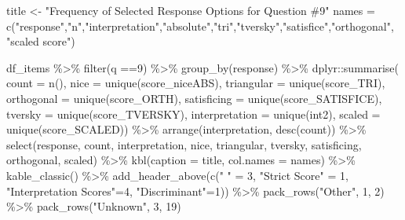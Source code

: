 \documentclass[
  letterpaper,
  DIV=11,
  numbers=noendperiod]{scrreprt}
\newenvironment{Shaded}{\begin{snugshade}}{\end{snugshade}}
\newcommand{\AttributeTok}[1]{\textcolor[rgb]{0.40,0.45,0.13}{#1}}
\newcommand{\DecValTok}[1]{\textcolor[rgb]{0.68,0.00,0.00}{#1}}
\newcommand{\FunctionTok}[1]{\textcolor[rgb]{0.28,0.35,0.67}{#1}}
\newcommand{\NormalTok}[1]{\textcolor[rgb]{0.00,0.23,0.31}{#1}}
\newcommand{\OtherTok}[1]{\textcolor[rgb]{0.00,0.23,0.31}{#1}}
\newcommand{\SpecialCharTok}[1]{\textcolor[rgb]{0.37,0.37,0.37}{#1}}
\newcommand{\StringTok}[1]{\textcolor[rgb]{0.13,0.47,0.30}{#1}}
\begin{document}
\begin{Shaded}
\begin{Highlighting}[]
\NormalTok{title }\OtherTok{\textless{}{-}} \StringTok{"Frequency of Selected Response Options for Question \#9"}
\NormalTok{names }\OtherTok{=} \FunctionTok{c}\NormalTok{(}\StringTok{"response"}\NormalTok{,}\StringTok{"n"}\NormalTok{,}\StringTok{"interpretation"}\NormalTok{,}\StringTok{"absolute"}\NormalTok{,}\StringTok{"tri"}\NormalTok{,}\StringTok{"tversky"}\NormalTok{,}\StringTok{"satisfice"}\NormalTok{,}\StringTok{"orthogonal"}\NormalTok{, }\StringTok{"scaled score"}\NormalTok{)}

\NormalTok{df\_items }\SpecialCharTok{\%\textgreater{}\%} \FunctionTok{filter}\NormalTok{(q }\SpecialCharTok{==}\DecValTok{9}\NormalTok{) }\SpecialCharTok{\%\textgreater{}\%} \FunctionTok{group\_by}\NormalTok{(response) }\SpecialCharTok{\%\textgreater{}\%}
\NormalTok{  dplyr}\SpecialCharTok{::}\FunctionTok{summarise}\NormalTok{( }\AttributeTok{count =} \FunctionTok{n}\NormalTok{(),}
                    \AttributeTok{nice =} \FunctionTok{unique}\NormalTok{(score\_niceABS),}
                    \AttributeTok{triangular =} \FunctionTok{unique}\NormalTok{(score\_TRI),}
                    \AttributeTok{orthogonal =}  \FunctionTok{unique}\NormalTok{(score\_ORTH),}
                    \AttributeTok{satisficing =}  \FunctionTok{unique}\NormalTok{(score\_SATISFICE),}
                    \AttributeTok{tversky =} \FunctionTok{unique}\NormalTok{(score\_TVERSKY),}
                    \AttributeTok{interpretation =} \FunctionTok{unique}\NormalTok{(int2),}
                    \AttributeTok{scaled =} \FunctionTok{unique}\NormalTok{(score\_SCALED)) }\SpecialCharTok{\%\textgreater{}\%}
  \FunctionTok{arrange}\NormalTok{(interpretation, }\FunctionTok{desc}\NormalTok{(count)) }\SpecialCharTok{\%\textgreater{}\%}
  \FunctionTok{select}\NormalTok{(response, count, interpretation, nice,}
\NormalTok{         triangular, tversky, satisficing, orthogonal, scaled) }\SpecialCharTok{\%\textgreater{}\%}
  \FunctionTok{kbl}\NormalTok{(}\AttributeTok{caption =}\NormalTok{ title, }\AttributeTok{col.names =}\NormalTok{ names) }\SpecialCharTok{\%\textgreater{}\%}  \FunctionTok{kable\_classic}\NormalTok{() }\SpecialCharTok{\%\textgreater{}\%}
  \FunctionTok{add\_header\_above}\NormalTok{(}\FunctionTok{c}\NormalTok{(}\StringTok{" "} \OtherTok{=} \DecValTok{3}\NormalTok{, }\StringTok{"Strict Score"} \OtherTok{=} \DecValTok{1}\NormalTok{, }\StringTok{"Interpretation Scores"}\OtherTok{=}\DecValTok{4}\NormalTok{, }\StringTok{"Discriminant"}\OtherTok{=}\DecValTok{1}\NormalTok{)) }\SpecialCharTok{\%\textgreater{}\%}
  \FunctionTok{pack\_rows}\NormalTok{(}\StringTok{"Other"}\NormalTok{, }\DecValTok{1}\NormalTok{, }\DecValTok{2}\NormalTok{) }\SpecialCharTok{\%\textgreater{}\%}
  \FunctionTok{pack\_rows}\NormalTok{(}\StringTok{"Unknown"}\NormalTok{, }\DecValTok{3}\NormalTok{, }\DecValTok{19}\NormalTok{)}
\end{Highlighting}
\end{Shaded}
\end{document}
